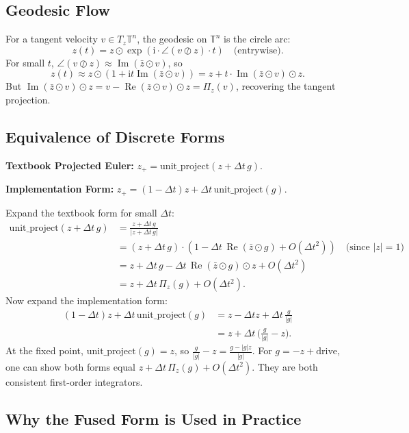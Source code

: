 \documentclass[11pt]{article}
\newcommand{\T}{\mathbb{T}}
\newcommand{\im}{\mathrm{i}}
\newcommand{\dt}{\Delta t}
\newcommand{\unitproject}{\mathrm{unit\_project}}
\DeclareMathOperator{\Real}{Re}
\DeclareMathOperator{\Imag}{Im}
\begin{document}
\subsection{Geodesic Flow}

For a tangent velocity $v \in T_z\T^n$, the geodesic on $\T^n$ is the circle arc:
\begin{equation}
z(t) = z \odot \exp(\im \cdot \angle(v \oslash z) \cdot t) \quad\text{(entrywise)}.
\end{equation}
For small $t$, $\angle(v \oslash z) \approx \Imag(\bar{z} \odot v)$, so
\begin{equation}
z(t) \approx z \odot (1 + \im t \Imag(\bar{z} \odot v)) = z + t \cdot \Imag(\bar{z} \odot v) \odot z.
\end{equation}
But $\Imag(\bar{z} \odot v) \odot z = v - \Real(\bar{z} \odot v) \odot z = \Pi_z(v)$, recovering the tangent projection.

\subsection{Equivalence of Discrete Forms}

\textbf{Textbook Projected Euler:} $z_+ = \unitproject(z + \dt\, g)$.

\textbf{Implementation Form:} $z_+ = (1-\dt)z + \dt\, \unitproject(g)$.

Expand the textbook form for small $\dt$:
\begin{align}
\unitproject(z + \dt\, g)
&= \frac{z + \dt\, g}{|z + \dt\, g|} \\
&= (z + \dt\, g) \cdot (1 - \dt\, \Real(\bar{z} \odot g) + O(\dt^2)) \quad\text{(since $|z|=1$)} \\
&= z + \dt\, g - \dt\, \Real(\bar{z} \odot g) \odot z + O(\dt^2) \\
&= z + \dt\, \Pi_z(g) + O(\dt^2).
\end{align}
Now expand the implementation form:
\begin{align}
(1-\dt)z + \dt\, \unitproject(g)
&= z - \dt z + \dt\, \frac{g}{|g|} \\
&= z + \dt\, \Big( \frac{g}{|g|} - z \Big).
\end{align}
At the fixed point, $\unitproject(g) = z$, so $\frac{g}{|g|} - z = \frac{g - |g|z}{|g|}$. For $g = -z + \text{drive}$, one can show both forms equal $z + \dt\, \Pi_z(g) + O(\dt^2)$. They are both consistent first-order integrators.

\subsection{Why the Fused Form is Used in Practice}
\end{document}

